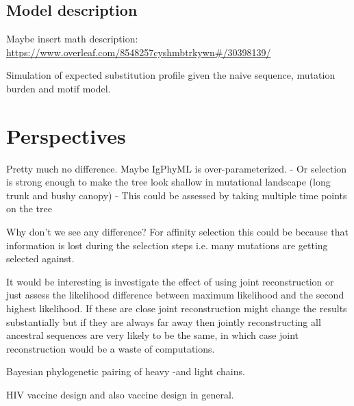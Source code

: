 \section{Model description}
Maybe insert math description:
\url{https://www.overleaf.com/8548257cyshmbtrkywn#/30398139/}




Simulation of expected substitution profile given the naive sequence, mutation burden and motif model.








\fi

\chapter{Perspectives}

Pretty much no difference.
Maybe IgPhyML is over-parameterized.
    - Or selection is strong enough to make the tree look shallow in mutational landscape (long trunk and bushy canopy)
    - This could be assessed by taking multiple time points on the tree

Why don't we see any difference? For affinity selection this could be because that information is lost during the selection steps i.e. many mutations are getting selected against.


It would be interesting is investigate the effect of using joint reconstruction or just assess the likelihood difference between maximum likelihood and the second highest likelihood. If these are close joint reconstruction might change the results substantially but if they are always far away then jointly reconstructing all ancestral sequences are very likely to be the same, in which case joint reconstruction would be a waste of computations.









Bayesian phylogenetic pairing of heavy -and light chains.


HIV vaccine design and also vaccine design in general.







